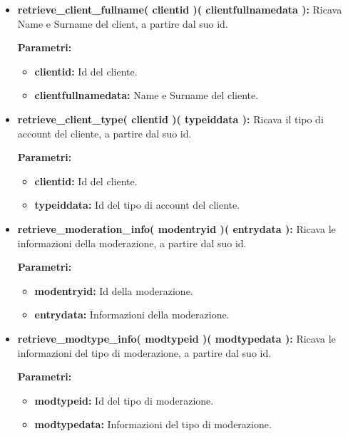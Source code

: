 \begin{itemize}
\begin{itemize}
			\item \textbf{retrieve\_client\_fullname( clientid )( clientfullnamedata ):} Ricava Name e Surname del client, a partire dal suo id.
				\begin{description}
    				\item[\textbf{Parametri:}]
				\end{description}
				\begin{itemize}
					\item \textbf{clientid:} Id del cliente.
					\item \textbf{clientfullnamedata:} Name e Surname del cliente.
				\end{itemize}
				
			\item \textbf{retrieve\_client\_type( clientid )( typeiddata ):} Ricava il tipo di account del cliente, a partire dal suo id.
				\begin{description}
    				\item[\textbf{Parametri:}]
				\end{description}
				\begin{itemize}
					\item \textbf{clientid:} Id del cliente.
					\item \textbf{typeiddata:} Id del tipo di account del cliente.
				\end{itemize}
			
			\item \textbf{retrieve\_moderation\_info( modentryid )( entrydata ):} Ricava le informazioni della moderazione, a partire dal suo id.
				\begin{description}
    				\item[\textbf{Parametri:}]
				\end{description}
				\begin{itemize}
					\item \textbf{modentryid:} Id della moderazione.
					\item \textbf{entrydata:} Informazioni della moderazione.
				\end{itemize}
				
			\item \textbf{retrieve\_modtype\_info( modtypeid )( modtypedata ):} Ricava le informazioni del tipo di moderazione, a partire dal suo id.
				\begin{description}
    				\item[\textbf{Parametri:}]
				\end{description}
				\begin{itemize}
					\item \textbf{modtypeid:} Id del tipo di moderazione.
					\item \textbf{modtypedata:} Informazioni del tipo di moderazione.
				\end{itemize}
				

\end{itemize}
\end{itemize}
